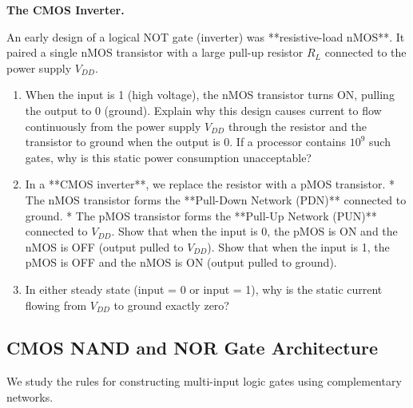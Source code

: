 \documentclass[12pt, a4paper]{book}
\begin{document}
\begin{puzzlebox}
\textbf{The CMOS Inverter.}

An early design of a logical NOT gate (inverter) was **resistive-load nMOS**. It paired a single nMOS transistor with a large pull-up resistor $R_L$ connected to the power supply $V_{DD}$.
\begin{enumerate}[label=(\alph*), leftmargin=*]
  \item When the input is 1 (high voltage), the nMOS transistor turns ON, pulling the output to 0 (ground).
        Explain why this design causes current to flow continuously from the power supply $V_{DD}$ through the resistor and the transistor to ground when the output is 0.
        If a processor contains $10^9$ such gates, why is this static power consumption unacceptable?
  \item In a **CMOS inverter**, we replace the resistor with a pMOS transistor.
        * The nMOS transistor forms the **Pull-Down Network (PDN)** connected to ground.
        * The pMOS transistor forms the **Pull-Up Network (PUN)** connected to $V_{DD}$.
        Show that when the input is 0, the pMOS is ON and the nMOS is OFF (output pulled to $V_{DD}$). Show that when the input is 1, the pMOS is OFF and the nMOS is ON (output pulled to ground).
  \item In either steady state (input = 0 or input = 1), why is the static current flowing from $V_{DD}$ to ground exactly zero?
\end{enumerate}
\end{puzzlebox}

\subsection{CMOS NAND and NOR Gate Architecture}

We study the rules for constructing multi-input logic gates using complementary networks.
\end{document}
